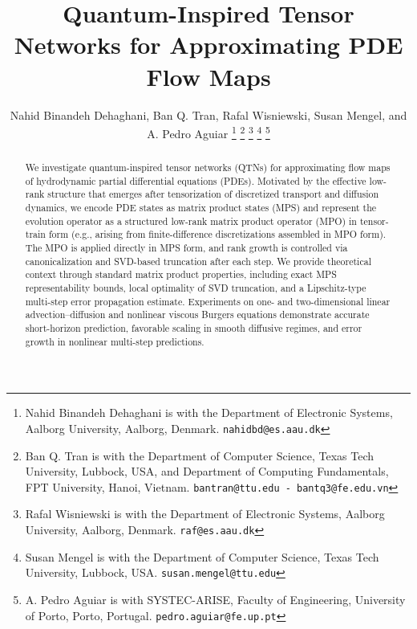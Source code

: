 \documentclass[letterpaper, 10 pt, conference]{ieeeconf}  %
\begin{document}
\title{Quantum-Inspired Tensor Networks for Approximating PDE Flow Maps}


\author{Nahid Binandeh Dehaghani, Ban Q. Tran, Rafal Wisniewski, Susan Mengel, and A. Pedro Aguiar
\thanks{Nahid Binandeh Dehaghani is with the Department of Electronic Systems, Aalborg University, Aalborg, Denmark.
        {\tt\small nahidbd@es.aau.dk}}%
\thanks{Ban Q. Tran is with the Department of Computer Science, Texas Tech University, Lubbock, USA, and Department of Computing Fundamentals, FPT University, Hanoi, Vietnam.
        {\tt\small bantran@ttu.edu - bantq3@fe.edu.vn}}%
\thanks{Rafal Wisniewski is with the Department of Electronic Systems, Aalborg University, Aalborg, Denmark. {\tt\small raf@es.aau.dk}}%
\thanks{Susan Mengel is with the Department of Computer Science, Texas Tech University, Lubbock, USA. {\tt\small susan.mengel@ttu.edu}} 
\thanks{A. Pedro Aguiar is with SYSTEC-ARISE, Faculty of Engineering, University of Porto, Porto, Portugal. {\tt\small 	pedro.aguiar@fe.up.pt}}
 }




\maketitle

\begin{abstract}
We investigate quantum-inspired tensor networks (QTNs) for approximating flow maps of hydrodynamic partial differential equations (PDEs). Motivated by the effective low-rank structure that emerges after tensorization of discretized transport and diffusion dynamics, we encode PDE states as matrix product states (MPS) and represent the evolution operator as a structured low-rank matrix product operator (MPO) in tensor-train form (e.g., arising from finite-difference discretizations assembled in MPO form).
The MPO is applied directly in MPS form, and rank growth is controlled via canonicalization and SVD-based truncation after each step.
We provide theoretical context through standard matrix product properties, including exact MPS representability bounds, local optimality of SVD truncation, and a Lipschitz-type multi-step error propagation estimate. Experiments on one- and two-dimensional linear advection--diffusion and nonlinear viscous Burgers equations demonstrate accurate short-horizon prediction, favorable scaling in smooth diffusive regimes, and error growth in nonlinear multi-step predictions.
\end{abstract}
\end{document}
